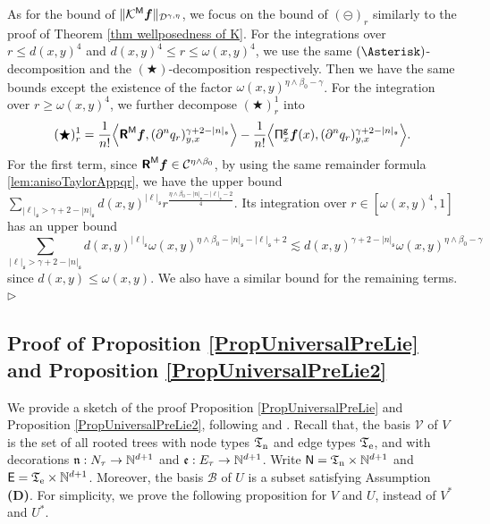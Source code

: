 \documentclass[10pt, reqno]{amsart}
\numberwithin{subsection}{section}
\numberwithin{subsubsection}{subsection}
\numberwithin{equation}{section} %
\newenvironment{Dem}[1][\unskip]{%
    \begin{list}{\hspace{1.15cm}{\sf \textbf{{\small Proof #1 --}}}}{%
        \setlength{\topsep}{0pt}%
        \setlength{\leftmargin}{0pt}%
        \setlength{\rightmargin}{0pt}%
        \setlength{\listparindent}{0pt}%
        \setlength{\itemindent}{0pt}%
        \setlength{\parsep}{0pt}%
        \addtolength{\leftmargin}{0pt}%
        \addtolength{\rightmargin}{0pt}%
    } \item }{\hfill $\rhd$\end{list}\smallskip}
\theoremstyle{mystyle}
\theoremstyle{mystyle2}
\theoremstyle{mystyle3}
\newcommand{\bsf}{\boldsymbol{f}}
\newcommand{\mfs}{\mathfrak{s}}
\newcommand\bbN{\mathbb{N}}
\newcommand{\mcB}{\mathcal{B}}
\newcommand{\mcC}{\mathcal{C}}
\newcommand{\mcD}{\mathcal{D}}
\newcommand{\mcK}{\mathcal{K}}
\newcommand\mcV{\mathcal V}
\begin{document}
\begin{Dem}[of Theorem \ref{thm wellposedness of K}']
As for the bound of $\|\mcK^{\sf M}\bsf\|_{\mcD^{\gamma,\eta}}$, we focus on the bound of $(\circleddash)_r$ similarly to the proof of Theorem \ref{thm wellposedness of K}.
For the integrations over $r\le d(x,y)^4$ and $d(x,y)^4\le r\le\omega(x,y)^4$, we use the same $(\Asterisk)$-decomposition and the $(\bigstar)$-decomposition respectively. Then we have the same bounds except the existence of the factor $\omega(x,y)^{\eta\wedge\beta_0-\gamma}$. For the integration over $r\ge\omega(x,y)^4$, we further decompose $(\bigstar)_r^1$ into
$$
(\bigstar)_r^1
=\frac1{n!} \Big\langle \textbf{\textsf{R}}^{\sf M}\bsf , (\partial^n q_r)_{y,x}^{\gamma+2-|n|_{\frak{s}}} \Big\rangle  
- \frac1{n!} \Big\langle {\sf\Pi}_x^{\sf g}\bsf(x) , (\partial^n q_r)_{y,x}^{\gamma+2-|n|_{\frak{s}}} \Big\rangle.  
$$
For the first term, since $\textbf{\textsf{R}}^{\sf M}\bsf\in\mcC^{\eta\wedge\beta_0}$, by using the same remainder formula \eqref{lem:anisoTaylorAppqr}, we have the upper bound $\sum_{|\ell|_\mfs>\gamma+2-|n|_\mfs}d(x,y)^{|\ell|_\mfs}r^{\frac{\eta\wedge\beta_0-|n|_\mfs-|\ell|_\mfs-2}4}$.
Its integration over $r\in[\omega(x,y)^4,1]$ has an upper bound
$$
\sum_{|\ell|_\mfs>\gamma+2-|n|_\mfs}d(x,y)^{|\ell|_\mfs}\omega(x,y)^{\eta\wedge\beta_0-|n|_\mfs-|\ell|_\mfs+2}
\lesssim d(x,y)^{\gamma+2-|n|_\mfs}\omega(x,y)^{\eta\wedge\beta_0-\gamma}
$$
since $d(x,y)\le\omega(x,y)$. We also have a similar bound for the remaining terms.
\end{Dem}



\bigskip



\subsection{Proof of Proposition \ref{PropUniversalPreLie} and Proposition \ref{PropUniversalPreLie2}}
\label{Appendix Proof of mpL}


We provide a sketch of the proof Proposition \ref{PropUniversalPreLie} and Proposition \ref{PropUniversalPreLie2}, following \cite{FoissyTypedTrees} and \cite{BM23}. Recall that, the basis $\mcV$ of $V$ is the set of all rooted trees with node types $\frak{T}_{\rm n}$ and edge types $\frak{T}_{\rm e}$, and with 
decorations $\frak{n}:N_\tau\to\bbN^{d+1}$ and $\frak{e}:E_\tau\to\bbN^{d+1}$.
Write ${\sf N}=\frak{T}_{\rm n}\times\bbN^{d+1}$ and ${\sf E}=\frak{T}_{\rm e}\times\bbN^{d+1}$.
Moreover, the basis $\mcB$ of $U$ is a subset satisfying Assumption \textsf{\textbf{(D)}}.
For simplicity, we prove the following proposition for $V$ and $U$, instead of $V^*$ and $U^*$.
\end{document}
